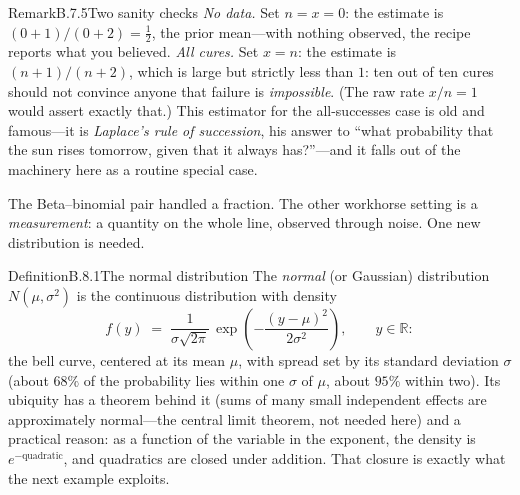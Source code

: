 \documentclass[main.tex]{subfiles}
\begin{document}
\begin{ObjL}{Remark}{B.7.5}{Two sanity checks}
\emph{No data.} Set $n=x=0$: the estimate is $(0+1)/(0+2)=\tfrac12$, the prior mean---with
nothing observed, the recipe reports what you believed. \emph{All cures.} Set $x=n$: the
estimate is $(n+1)/(n+2)$, which is large but strictly less than $1$: ten out of ten cures
should not convince anyone that failure is \emph{impossible}. (The raw rate $x/n=1$ would
assert exactly that.) This estimator for the all-successes case is old and famous---it is
\emph{Laplace's rule of succession}, his answer to ``what probability that the sun rises
tomorrow, given that it always has?''---and it falls out of the machinery here as a routine
special case.
\end{ObjL}


The Beta--binomial pair handled a fraction. The other workhorse setting is a
\emph{measurement}: a quantity on the whole line, observed through noise. One new
distribution is needed.

\begin{Obj}{Definition}{B.8.1}{The normal distribution}
The \emph{normal} (or Gaussian) distribution $N(\mu,\sigma^2)$ is the continuous
distribution with density
\[ f(y) \;=\; \frac{1}{\sigma\sqrt{2\pi}}\,
   \exp\!\left( -\frac{(y-\mu)^2}{2\sigma^2} \right) , \qquad y\in\mathbb{R} : \]
the bell curve, centered at its mean $\mu$, with spread set by its standard deviation
$\sigma$ (about $68\%$ of the probability lies within one $\sigma$ of $\mu$, about $95\%$
within two). Its ubiquity has a theorem behind it (sums of many small independent effects
are approximately normal---the central limit theorem, not needed here) and a practical
reason: as a function of the variable in the exponent, the density is
$e^{-\text{quadratic}}$, and quadratics are closed under addition. That closure is exactly
what the next example exploits.
\end{Obj}
\end{document}
